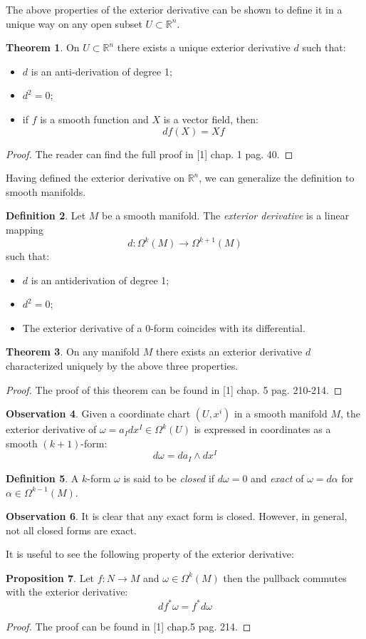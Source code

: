 \documentclass[12pt,a4paper]{report}
\theoremstyle{definition}
\newtheorem{Def}{Definition}[chapter]
\theoremstyle{Theorem}
\newtheorem{Theo}[Def]{Theorem}
\newtheorem{Prop}[Def]{Proposition}
\theoremstyle{definition}
\theoremstyle{definition}
\newtheorem{Obs}[Def]{Observation}
\begin{document}
	The above properties of the exterior derivative can be shown to define it in a unique way on any open subset $U\subset\mathbb{R}^n$.
	\begin{Theo}
		On $U\subset\mathbb{R}^n$ there exists a unique exterior derivative $d$ such that:
		\begin{itemize}
			\item $d$ is an anti-derivation of degree 1;
			\item $d^2=0$;
			\item if $f$ is a smooth function and $X$ is a vector field, then:
			$$df(X)=Xf$$
		\end{itemize}
	\end{Theo}
	\begin{proof}
		The reader can find the full proof in [1] chap. 1 pag. 40.
	\end{proof}
	Having defined the exterior derivative on $\mathbb{R}^n$, we can generalize the definition to smooth manifolds.
	\begin{Def}
		Let $M$ be a smooth manifold. The \textit{exterior derivative} is a linear mapping 
		$$d:\Omega^k(M)\rightarrow\Omega^{k+1}(M)$$
		such that:
		\begin{itemize}
			\item $d$ is an antiderivation of degree 1;
			\item $d^2=0$;
			\item The exterior derivative of a 0-form coincides with its differential.
		\end{itemize}
	\end{Def}
	\begin{Theo}
		On any manifold $M$ there exists an exterior derivative $d$ characterized uniquely by the above three properties.
	\end{Theo}
	\begin{proof}
		The proof of this theorem can be found in [1] chap. 5 pag. 210-214.
	\end{proof}
	\begin{Obs}
		Given a coordinate chart $(U,x^i)$ in a smooth manifold $M$, the exterior derivative of $\omega=a_Idx^I\in \Omega^k(U)$ is expressed in coordinates as a smooth $(k+1)$-form:
		$$d\omega=da_I\wedge dx^I$$
	\end{Obs}
	\begin{Def}
		A $k$-form $\omega$ is said to be \textit{closed} if $d\omega=0$ and \textit{exact} of $\omega=d\alpha$ for $\alpha\in\Omega^{k-1}(M)$.
	\end{Def}
	\begin{Obs}
		It is clear that any exact form is closed. However, in general, not all closed forms are exact.
	\end{Obs}
	It is useful to see the following property of the exterior derivative:
	\begin{Prop}
		Let $f:N\rightarrow M$ and $\omega\in \Omega^k(M)$ then the pullback commutes with the exterior derivative:
			$$df^*\omega=f^*d\omega$$
	\end{Prop}
		\begin{proof}
		The proof can be found in [1] chap.5 pag. 214.
		\end{proof}
\end{document}
